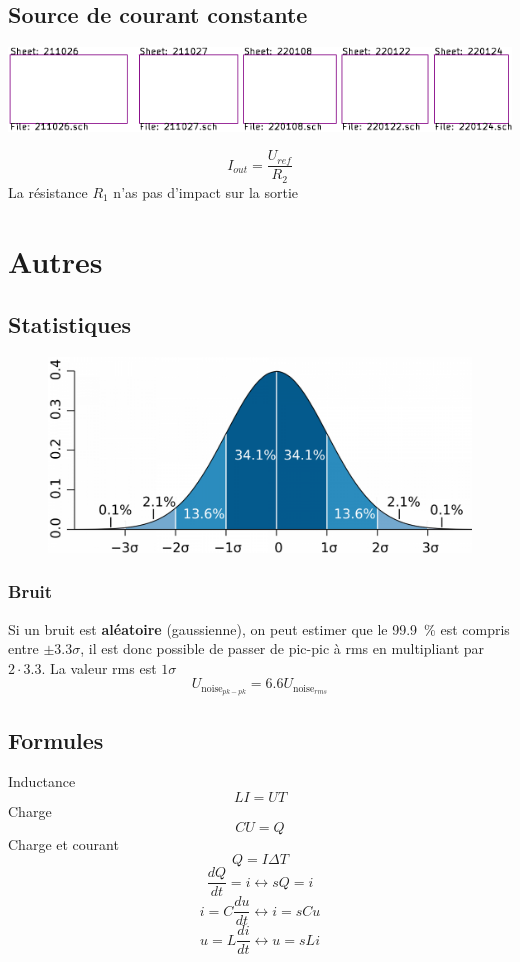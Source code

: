 \documentclass[resume]{subfiles}
\begin{document}
\begin{multicols}{3}
\subsection{Source de courant constante}
\begin{center}
\includegraphics[scale=1,page=25]{../KiCad/resume-crop.pdf}
\end{center}
$$\boxed{I_{out}=\frac{U_{ref}}{R_2}}$$
La résistance $R_1$ n'as pas d'impact sur la sortie
\columnbreak
\section{Autres}
\subsection{Statistiques}
\begin{figure}[H]
\centering
\includegraphics[width=0.6\columnwidth]{gauss.png}
\end{figure}
\subsubsection{Bruit}
Si un bruit est \textbf{aléatoire} (gaussienne), on peut estimer que le \SI{99.9}{\percent} est compris entre $\pm 3.3\sigma$, il est donc possible de passer de pic-pic à rms en multipliant par $2\cdot 3.3$. La valeur rms est $1\sigma$
$$U_{\text{noise}_{pk-pk}}=6.6 U_{\text{noise}_{rms}}$$
\columnbreak
\subsection{Formules}
Inductance
$$LI=UT$$
Charge
$$CU=Q$$
Charge et courant
$$Q=I\Delta T$$
$$\frac{dQ}{dt}=i\longleftrightarrow sQ=i$$
$$i=C\frac{du}{dt}\longleftrightarrow i=sCu$$
$$u=L\frac{di}{dt}\longleftrightarrow u=sLi$$





\end{multicols}
\end{document}
